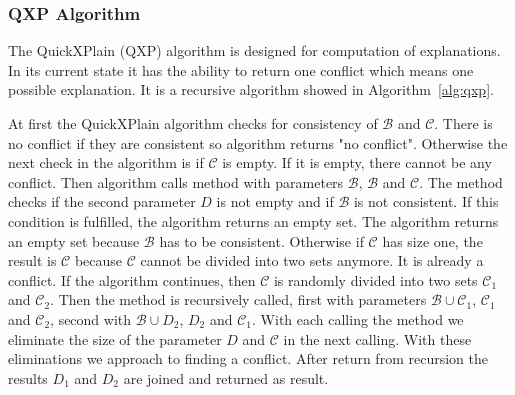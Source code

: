 \documentclass[12pt,a4paper]{article}
\begin{document}
\subsubsection{QXP Algorithm}

The QuickXPlain (QXP) algorithm is designed for computation of explanations. In its current state it has the ability to return one conflict which means one possible explanation. It is a recursive algorithm showed in Algorithm~\ref{alg:qxp}.

At first the QuickXPlain algorithm checks for consistency of $\mathcal{B}$ and $\mathcal{C}$. There is no conflict if they are consistent so algorithm returns "no conflict". Otherwise the next check in the algorithm is if $\mathcal{C}$ is empty. If it is empty, there cannot be any conflict. Then algorithm calls method  with parameters $\mathcal{B}$, $\mathcal{B}$ and $\mathcal{C}$. The  method checks if the second parameter $D$ is not empty and if $\mathcal{B}$ is not consistent. If this condition is fulfilled, the algorithm returns an empty set. The algorithm returns an empty set because $\mathcal{B}$ has to be consistent. Otherwise if $\mathcal{C}$ has size one, the result is $\mathcal{C}$ because $\mathcal{C}$ cannot be divided into two sets anymore. It is already a conflict. If the algorithm continues, then $\mathcal{C}$ is randomly divided into two sets $\mathcal{C}_{1}$ and $\mathcal{C}_{2}$. Then the method  is recursively called, first with parameters $\mathcal{B} \cup \mathcal{C}_{1}$, $\mathcal{C}_{1}$ and $\mathcal{C}_{2}$, second with $\mathcal{B} \cup D_{2}$, $D_{2}$ and $\mathcal{C}_{1}$. With each calling the  method we eliminate the size of the parameter $D$ and $\mathcal{C}$ in the next calling. With these eliminations we approach to finding a conflict. After return from recursion the results $D_{1}$ and $D_{2}$ are joined and returned as result.
\end{document}
